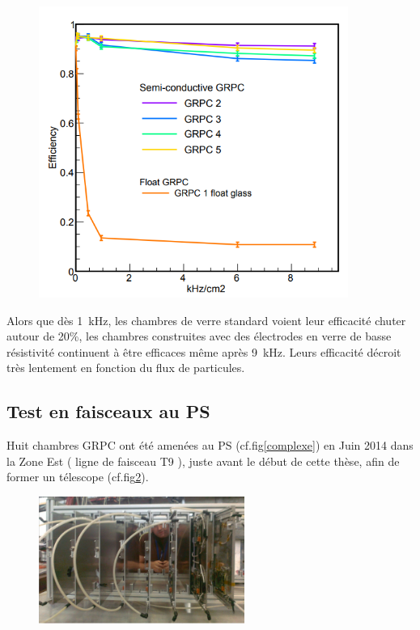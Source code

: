 \begin{figure}[ht!]
	\centering
	\includegraphics[width=0.9\textwidth]{GLA/effiDesy.png}
	\label{effiDesy}
\end{figure}

Alors que dès \SI{1}{\kilo\hertz}, les chambres de verre standard voient leur efficacité chuter autour de 20\%, les chambres construites avec des électrodes en verre de basse résistivité continuent à être efficaces même après \SI{9}{\kilo\hertz}. Leurs efficacité décroit très lentement en fonction du flux de particules.

\subsection{Test en faisceaux au PS}
Huit chambres GRPC ont été amenées au PS (cf.fig\ref{complexe}) en Juin \num{2014} dans la Zone Est ( ligne de faisceau T9 ), juste avant le début de cette thèse, afin de former un télescope (cf.fig\ref{TelescopePS}).

\begin{figure}[ht!]
	\centering
	\includegraphics[width=0.6\textwidth]{GLA/TelescopePS.png}
	\label{TelescopePS}
\end{figure}

